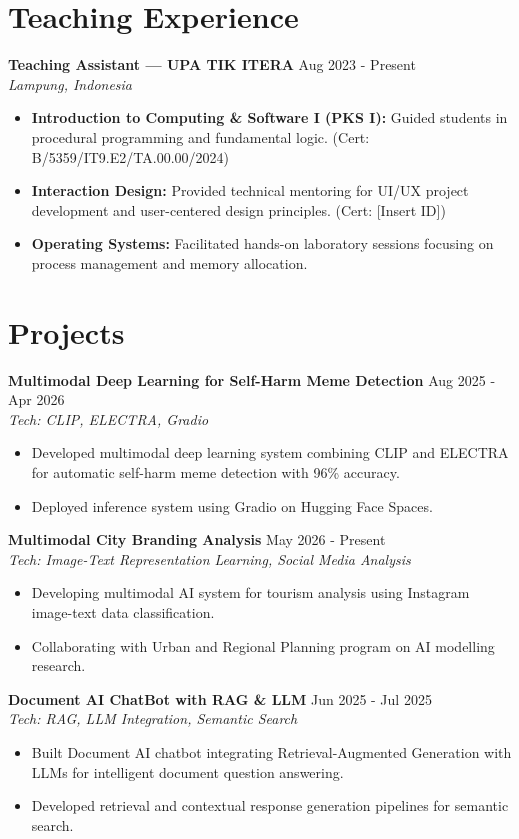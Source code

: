 \documentclass[11pt,a4paper]{article}
\newcommand{\resumeSubheading}[4]{%
  \textbf{#1} \hfill #2 \\
  \textit{#3} \hfill \textit{#4}
}
\newcommand{\resumeProject}[3]{%
  \textbf{#1} \hfill #2 \\
  \textit{#3}
}
\begin{document}
\section*{Teaching Experience}
\resumeSubheading{Teaching Assistant — UPA TIK ITERA}{Aug 2023 - Present}{Lampung, Indonesia}{}
\begin{itemize}
  \item \textbf{Introduction to Computing \& Software I (PKS I):} Guided students in procedural programming and fundamental logic. (Cert: B/5359/IT9.E2/TA.00.00/2024)
  \item \textbf{Interaction Design:} Provided technical mentoring for UI/UX project development and user-centered design principles. (Cert: [Insert ID])
  \item \textbf{Operating Systems:} Facilitated hands-on laboratory sessions focusing on process management and memory allocation.
\end{itemize}

\section*{Projects}
\resumeProject{Multimodal Deep Learning for Self-Harm Meme Detection}{Aug 2025 - Apr 2026}{Tech: CLIP, ELECTRA, Gradio}
\begin{itemize}
  \item Developed multimodal deep learning system combining CLIP and ELECTRA for automatic self-harm meme detection with 96\% accuracy.
  \item Deployed inference system using Gradio on Hugging Face Spaces.
\end{itemize}

\resumeProject{Multimodal City Branding Analysis}{May 2026 - Present}{Tech: Image-Text Representation Learning, Social Media Analysis}
\begin{itemize}
  \item Developing multimodal AI system for tourism analysis using Instagram image-text data classification.
  \item Collaborating with Urban and Regional Planning program on AI modelling research.
\end{itemize}

\resumeProject{Document AI ChatBot with RAG \& LLM}{Jun 2025 - Jul 2025}{Tech: RAG, LLM Integration, Semantic Search}
\begin{itemize}
  \item Built Document AI chatbot integrating Retrieval-Augmented Generation with LLMs for intelligent document question answering.
  \item Developed retrieval and contextual response generation pipelines for semantic search.
\end{itemize}
\end{document}
